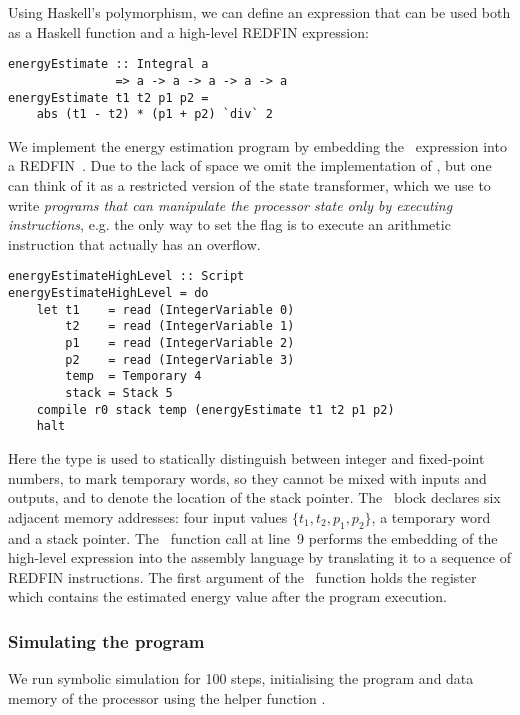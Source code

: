 Using Haskell's polymorphism, we can define an expression that can
be used both as a Haskell function and a high-level REDFIN expression:


\begin{verbatim}
energyEstimate :: Integral a
               => a -> a -> a -> a -> a
energyEstimate t1 t2 p1 p2 =
    abs (t1 - t2) * (p1 + p2) `div` 2
\end{verbatim}


\noindent
We implement the energy estimation program by embedding the~
expression into a REDFIN~. Due to the lack of space we omit the
implementation of , but one can think of it as a restricted version
of the  state transformer, which we use to write \emph{programs that
can manipulate the processor state only by executing instructions}, e.g. the
only way to set the  flag is to execute an arithmetic instruction
that actually has an overflow.


\begin{verbatim}
energyEstimateHighLevel :: Script
energyEstimateHighLevel = do
    let t1    = read (IntegerVariable 0)
        t2    = read (IntegerVariable 1)
        p1    = read (IntegerVariable 2)
        p2    = read (IntegerVariable 3)
        temp  = Temporary 4
        stack = Stack 5
    compile r0 stack temp (energyEstimate t1 t2 p1 p2)
    halt
\end{verbatim}
\label{energyEstimateHighLevel}


\noindent
Here the type  is used to statically distinguish between integer
and fixed-point numbers,  to mark temporary words, so they cannot
be mixed with inputs and outputs, and  to denote the location of the
stack pointer. The~ block declares six adjacent memory addresses: four
input values $\{t_1, t_2, p_1, p_2\}$, a temporary word and a stack pointer.
The~ function call at line~9 performs the embedding of the high-level
 expression into the assembly language by translating it to a
sequence of REDFIN instructions. The first argument of the~ function
holds the register~ which contains the estimated energy value after the
program execution.


\subsubsection{Simulating the program}
We run symbolic simulation for 100 steps, initialising the program and data
memory of the processor using the helper function .

